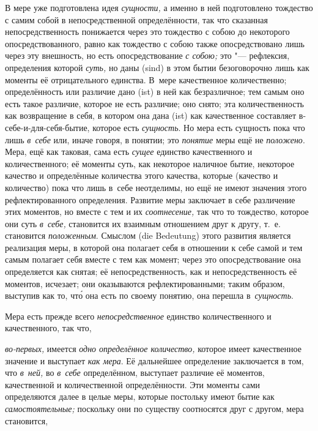 В мере уже подготовлена идея {\em сущности,} а именно в ней подготовлено
тождество с самим собой в непосредственной определённости, так что сказанная
непосредственность понижается через это тождество с собою до некоторого
опосредствованного, равно как тождество с собою также опосредствовано лишь
через эту внешность, но есть опосредствование {\em с собою;} это "---
рефлексия, определения которой {\em суть,} но даны (sind) в этом бытии
безоговорочно лишь как моменты её отрицательного единства. В~мере качественное
количественно; определённость или различие дано (ist) в ней как безразличное;
тем самым оно есть такое различие, которое не есть различие; оно снято; эта
количественность как возвращение в себя, в котором она дана (ist) как
качественное составляет в-себе-и-для-себя-бытие, которое есть {\em сущность}.
Но мера есть сущность пока что лишь {\em в~себе} или, иначе говоря, в понятии;
это {\em понятие} меры ещё не {\em положено}. Мера, ещё как таковая, сама есть
{\em сущее} единство качественного и количественного; её моменты суть, как
некоторое наличное бытие, некоторое качество и определённые количества этого
качества, которые (качество и количество) пока что лишь в~себе неотделимы, но
ещё не имеют значения этого рефлектированного определения. Развитие меры
заключает в себе различение этих моментов, но вместе с тем и их
{\em соотнесение,} так что то тождество, которое они суть {\em в~себе,}
становится их взаимным отношением друг к другу, т.~е. становится
{\em положенным}. Смыслом (die Bedeutung) этого развития является реализация
меры, в которой она полагает себя в отношении к себе самой и тем самым полагает
себя вместе с тем как момент; через это опосредствование она определяется как
снятая; её непосредственность, как и непосредственность её моментов, исчезает;
они оказываются рефлектированными; таким образом, выступив как то, чт\'{о} она
есть по своему понятию, она перешла в~{\em сущность}.

Мера есть прежде всего {\em непосредственное} единство количественного
и качественного, так что,

{\em во-первых,} имеется {\em одно определённое количество,} которое имеет
качественное значение и выступает {\em как мера}. Её дальнейшее определение
заключается в том, что {\em в~ней,} во {\em в~себе} определённом, выступает
различие её моментов, качественной и количественной определённости. Эти моменты
сами определяются далее в целые меры, которые постольку имеют бытие как
{\em самостоятельные;} поскольку они по существу соотносятся друг с другом,
мера становится,

